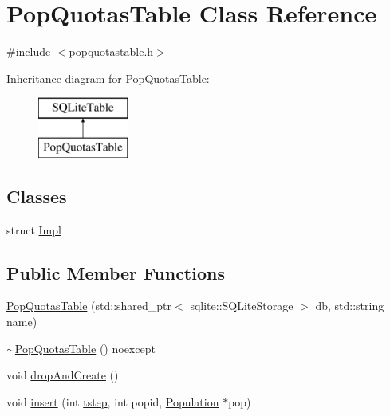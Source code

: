 \hypertarget{class_pop_quotas_table}{}\section{Pop\+Quotas\+Table Class Reference}
\label{class_pop_quotas_table}


{\ttfamily \#include $<$popquotastable.\+h$>$}

Inheritance diagram for Pop\+Quotas\+Table\+:\begin{figure}[H]
\begin{center}
\leavevmode
\includegraphics[height=2.000000cm]{da/d3d/class_pop_quotas_table}
\end{center}
\end{figure}
\subsection*{Classes}
\begin{DoxyCompactItemize}
\item 
struct \mbox{\hyperlink{struct_pop_quotas_table_1_1_impl}{Impl}}
\end{DoxyCompactItemize}
\subsection*{Public Member Functions}
\begin{DoxyCompactItemize}
\item 
\mbox{\hyperlink{class_pop_quotas_table_a23ca08dbe563b58539bb3fba22e85c2f}{Pop\+Quotas\+Table}} (std\+::shared\+\_\+ptr$<$ sqlite\+::\+S\+Q\+Lite\+Storage $>$ db, std\+::string name)
\item 
\mbox{\hyperlink{class_pop_quotas_table_a5cb1ceac7abc81063857498ddd015a2f}{$\sim$\+Pop\+Quotas\+Table}} () noexcept
\item 
void \mbox{\hyperlink{class_pop_quotas_table_aa071b6a77b49537f11f9d55ad626e9c0}{drop\+And\+Create}} ()
\item 
void \mbox{\hyperlink{class_pop_quotas_table_ac5ed71c6d9c37686f61838cc3e8fd3fc}{insert}} (int \mbox{\hyperlink{thread__vessels_8cpp_a84bc73d278de929ec9974e1a95d9b23a}{tstep}}, int popid, \mbox{\hyperlink{class_population}{Population}} $\ast$pop)
\end{DoxyCompactItemize}
